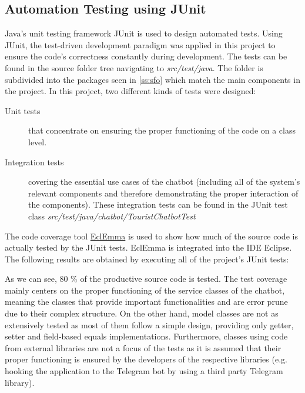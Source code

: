 \subsection{Automation Testing using JUnit}
Java’s unit testing framework JUnit is used to design automated tests. Using JUnit, the test-driven development paradigm was applied in this project to ensure the code’s correctness constantly during development. The tests can be found in the source folder tree navigating to \textit{src/test/java}. The folder is subdivided into the packages seen in \ref{ss:sfo} which match the main components in the project. In this project, two different kinds of tests were designed:
\begin{description}
\item[Unit tests] that concentrate on ensuring the proper functioning of the code on a class level. 
\item[Integration tests] covering the essential use cases of the chatbot (including all of the system’s relevant components and therefore demonstrating the proper interaction of the components). These integration tests can be found in the JUnit test class \textit{src/test/java/chatbot/TouristChatbotTest}
\end{description}

The code coverage tool \href{http://www.eclemma.org/}{EclEmma} is used to show how much of the source code is actually tested by the JUnit tests. EclEmma is integrated into the IDE Eclipse. The following results are obtained by executing all of the project’s JUnit tests:


As we can see, 80 \% of the productive source code is tested. The test coverage mainly centers on the proper functioning of the service classes of the chatbot, meaning the classes that provide important functionalities and are error prune due to their complex structure. On the other hand, model classes are not as extensively tested as most of them follow a simple design, providing only getter, setter and field-based equals implementations. Furthermore, classes using code from external libraries are not a focus of the tests as it is assumed that their proper functioning is ensured by the developers of the respective libraries (e.g. hooking the application to the Telegram bot by using a third party Telegram library). 

